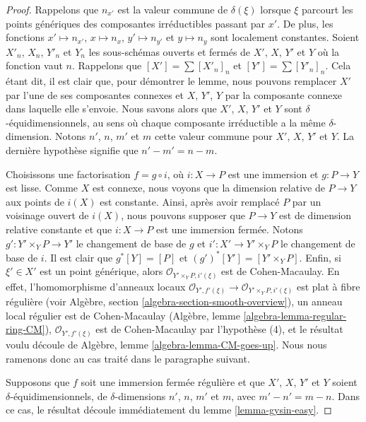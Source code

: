 \begin{proof}
Rappelons que $n_{x'}$ est la valeur commune de $\delta(\xi)$
lorsque $\xi$ parcourt les points génériques des composantes irréductibles
passant par $x'$. De plus, les fonctions
$x' \mapsto n_{x'}$, $x \mapsto n_x$, $y' \mapsto n_{y'}$ et
$y \mapsto n_y$ sont localement constantes. Soient $X'_n$, $X_n$, $Y'_n$
et $Y_n$ les sous-schémas ouverts et fermés de $X'$, $X$, $Y'$ et
$Y$ où la fonction vaut $n$. Rappelons que
$[X'] = \sum [X'_n]_n$ et $[Y'] = \sum [Y'_n]_n$.
Cela étant dit, il est clair que, pour démontrer le lemme, nous
pouvons remplacer $X'$ par l'une de ses composantes connexes
et $X$, $Y'$, $Y$ par la composante connexe dans laquelle
elle s'envoie. Nous savons alors que $X'$, $X$, $Y'$ et
$Y$ sont $\delta$-équidimensionnels, au sens où
chaque composante irréductible a la même $\delta$-dimension.
Notons $n'$, $n$, $m'$ et $m$ cette valeur commune
pour $X'$, $X$, $Y'$ et $Y$. La dernière hypothèse
signifie que $n' - m' = n - m$.

\medskip\noindent
Choisissons une factorisation $f = g \circ i$, où $i : X \to P$
est une immersion et $g : P \to Y$ est lisse. Comme $X$ est connexe,
nous voyons que la dimension relative de $P \to Y$ aux points de $i(X)$
est constante. Ainsi, après avoir remplacé $P$ par un voisinage ouvert
de $i(X)$, nous pouvons supposer que $P \to Y$ est de dimension relative constante
et que $i : X \to P$ est une immersion fermée.
Notons $g' : Y' \times_Y P \to Y'$ le changement de base de $g$ et
$i' : X' \to Y' \times_Y P$ le changement de base de $i$.
Il est clair que $g^*[Y] = [P]$ et $(g')^*[Y'] = [Y' \times_Y P]$.
Enfin, si $\xi' \in X'$ est un point générique, alors
$\mathcal{O}_{Y' \times_Y P, i'(\xi)}$ est de Cohen-Macaulay.
En effet, l'homomorphisme d'anneaux locaux
$\mathcal{O}_{Y', f'(\xi)} \to \mathcal{O}_{Y' \times_Y P, i'(\xi)}$
est plat à fibre régulière
(voir Algèbre, section \ref{algebra-section-smooth-overview}),
un anneau local régulier est de Cohen-Macaulay
(Algèbre, lemme \ref{algebra-lemma-regular-ring-CM}),
$\mathcal{O}_{Y', f'(\xi)}$ est de Cohen-Macaulay par l'hypothèse
(4), et le résultat voulu découle de
Algèbre, lemme \ref{algebra-lemma-CM-goes-up}.
Nous nous ramenons donc au cas traité dans le paragraphe suivant.

\medskip\noindent
Supposons que $f$ soit une immersion fermée régulière et que $X'$, $X$, $Y'$ et
$Y$ soient $\delta$-équidimensionnels, de $\delta$-dimensions
$n'$, $n$, $m'$ et $m$, avec $m' - n' = m - n$.
Dans ce cas, le résultat découle immédiatement du
lemme \ref{lemma-gysin-easy}.
\end{proof}


